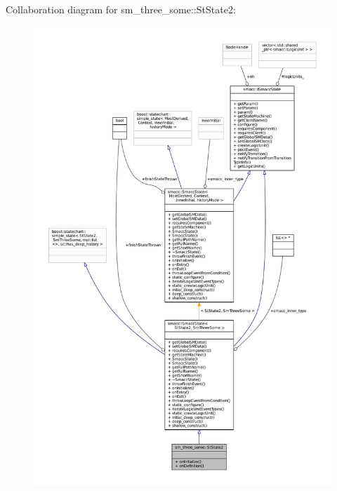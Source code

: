 Collaboration diagram for sm\+\_\+three\+\_\+some\+:\+:St\+State2\+:
\nopagebreak
\begin{figure}[H]
\begin{center}
\leavevmode
\includegraphics[width=350pt]{structsm__three__some_1_1StState2__coll__graph}
\end{center}
\end{figure}
